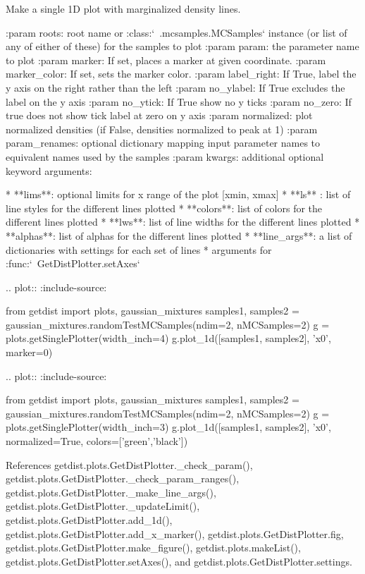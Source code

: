 \begin{DoxyVerb}Make a single 1D plot with marginalized density lines.

:param roots: root name or :class:`~.mcsamples.MCSamples` instance (or list of any of either of these) for the samples to plot
:param param: the parameter name to plot
:param marker: If set, places a marker at given coordinate.
:param marker_color: If set, sets the marker color.
:param label_right: If True, label the y axis on the right rather than the left
:param no_ylabel: If True excludes the label on the y axis
:param no_ytick: If True show no y ticks
:param no_zero: If true does not show tick label at zero on y axis
:param normalized: plot normalized densities (if False, densities normalized to peak at 1)
:param param_renames: optional dictionary mapping input parameter names to equivalent names used by the samples
:param kwargs: additional optional keyword arguments:

* **lims**: optional limits for x range of the plot [xmin, xmax]
* **ls** : list of line styles for the different lines plotted 
* **colors**: list of colors for the different lines plotted 
* **lws**: list of line widths for the different lines plotted
* **alphas**: list of alphas for the different lines plotted 
* **line_args**: a list of dictionaries with settings for each set of lines
* arguments for :func:`~GetDistPlotter.setAxes`

.. plot::
   :include-source:

    from getdist import plots, gaussian_mixtures
    samples1, samples2 = gaussian_mixtures.randomTestMCSamples(ndim=2, nMCSamples=2)
    g = plots.getSinglePlotter(width_inch=4)
    g.plot_1d([samples1, samples2], 'x0', marker=0)

.. plot::
   :include-source:

    from getdist import plots, gaussian_mixtures
    samples1, samples2 = gaussian_mixtures.randomTestMCSamples(ndim=2, nMCSamples=2)
    g = plots.getSinglePlotter(width_inch=3)
    g.plot_1d([samples1, samples2], 'x0', normalized=True, colors=['green','black'])\end{DoxyVerb}
 

References getdist.\+plots.\+Get\+Dist\+Plotter.\+\_\+check\+\_\+param(), getdist.\+plots.\+Get\+Dist\+Plotter.\+\_\+check\+\_\+param\+\_\+ranges(), getdist.\+plots.\+Get\+Dist\+Plotter.\+\_\+make\+\_\+line\+\_\+args(), getdist.\+plots.\+Get\+Dist\+Plotter.\+\_\+update\+Limit(), getdist.\+plots.\+Get\+Dist\+Plotter.\+add\+\_\+1d(), getdist.\+plots.\+Get\+Dist\+Plotter.\+add\+\_\+x\+\_\+marker(), getdist.\+plots.\+Get\+Dist\+Plotter.\+fig, getdist.\+plots.\+Get\+Dist\+Plotter.\+make\+\_\+figure(), getdist.\+plots.\+make\+List(), getdist.\+plots.\+Get\+Dist\+Plotter.\+set\+Axes(), and getdist.\+plots.\+Get\+Dist\+Plotter.\+settings.



